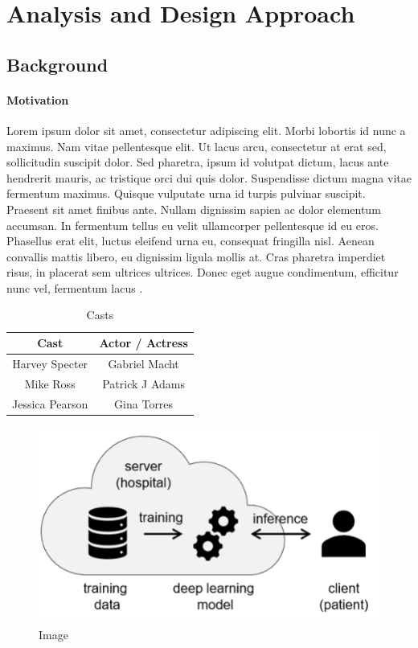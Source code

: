 \chapter{Analysis and Design Approach}

\section{Background}

\subsubsection{Motivation}

Lorem ipsum dolor sit amet, consectetur adipiscing elit. Morbi lobortis id nunc a maximus. Nam vitae pellentesque elit. Ut lacus arcu, consectetur at erat sed, sollicitudin suscipit dolor. Sed pharetra, ipsum id volutpat dictum, lacus ante hendrerit mauris, ac tristique orci dui quis dolor. Suspendisse dictum magna vitae fermentum maximus. Quisque vulputate urna id turpis pulvinar suscipit. Praesent sit amet finibus ante. Nullam dignissim sapien ac dolor elementum accumsan. In fermentum tellus eu velit ullamcorper pellentesque id eu eros. Phasellus erat elit, luctus eleifend urna eu, consequat fringilla nisl. Aenean convallis mattis libero, eu dignissim ligula mollis at. Cras pharetra imperdiet risus, in placerat sem ultrices ultrices. Donec eget augue condimentum, efficitur nunc vel, fermentum lacus \cite{book}.

\begin{table}[!ht]
    \centering
    \begin{tabular}{@{}cc@{}}
    \toprule
    Cast            & Actor / Actress \\ \midrule
    Harvey Specter  & Gabriel Macht   \\
    Mike Ross       & Patrick J Adams \\
    Jessica Pearson & Gina Torres     \\ \bottomrule
    \end{tabular}
    \caption{Casts}
\end{table}

\begin{figure}[!ht]
    \centering
    \includegraphics{figures/diag.png}
    \caption{Image}
\end{figure}

